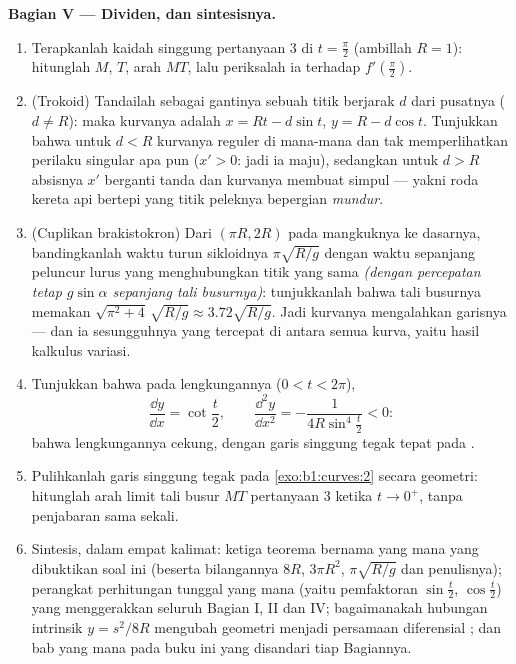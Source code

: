 \begin{problem}
\medskip
\noindent\textbf{Bagian V --- Dividen, dan sintesisnya.}
\begin{enumerate}[resume]
  \item Terapkanlah kaidah singgung pertanyaan 3 di $t =
        \frac\pi2$ (ambillah $R = 1$): hitunglah $M$, $T$,
        arah $MT$, lalu periksalah ia terhadap
        $f'(\frac\pi2)$.
  \item (Trokoid) Tandailah sebagai gantinya sebuah titik berjarak $d$ dari
        pusatnya ($d \neq R$): maka kurvanya adalah $x = Rt -
        d\sin t$, $y = R - d\cos t$. Tunjukkan bahwa untuk $d < R$
        kurvanya reguler di mana-mana dan tak memperlihatkan perilaku
        singular apa pun ($x' > 0$: jadi ia maju), sedangkan untuk $d
        > R$ absisnya $x'$ berganti tanda dan kurvanya membuat
        simpul --- yakni roda kereta api bertepi yang titik peleknya
        bepergian \emph{mundur}.
  \item (Cuplikan brakistokron) Dari  $(\pi R, 2R)$ pada
        mangkuknya ke dasarnya, bandingkanlah waktu turun sikloidnya
        $\pi\sqrt{R/g}$ dengan waktu sepanjang peluncur lurus
        yang menghubungkan titik yang sama \emph{(dengan percepatan tetap
        $g\sin\alpha$ sepanjang tali busurnya)}: tunjukkanlah bahwa tali busurnya memakan
        $\sqrt{\pi^2 + 4}\,\sqrt{R/g} \approx 3.72\sqrt{R/g}$.
        Jadi kurvanya mengalahkan garisnya --- dan ia sesungguhnya yang tercepat
        di antara semua kurva, yaitu hasil kalkulus variasi.
  \item Tunjukkan bahwa pada lengkungannya ($0 < t < 2\pi$),
        \[
        \frac{\dd y}{\dd x} = \cot\frac t2,
        \qquad
        \frac{\dd^2 y}{\dd x^2} =
        -\frac{1}{4R\sin^4\frac t2} < 0 :
        \]
        bahwa lengkungannya cekung, dengan garis singgung tegak tepat pada
        .
  \item Pulihkanlah garis singgung tegak  pada
        \cref{exo:b1:curves:2} secara geometri: hitunglah arah
        limit tali busur $MT$ pertanyaan 3 ketika $t \to
        0^{+}$, tanpa penjabaran sama sekali.
  \item Sintesis, dalam empat kalimat: ketiga teorema bernama yang mana
        yang dibuktikan soal ini (beserta bilangannya $8R$, $3\pi
        R^2$, $\pi\sqrt{R/g}$ dan penulisnya); perangkat perhitungan
        tunggal yang mana (yaitu pemfaktoran $\sin\frac t2$, $\cos\frac t2$)
        yang menggerakkan seluruh Bagian I, II dan IV; bagaimanakah
        hubungan intrinsik $y = s^2/8R$ mengubah geometri
        menjadi persamaan diferensial ; dan bab yang mana
        pada buku ini yang disandari tiap Bagiannya.

\end{enumerate}
\end{problem}
